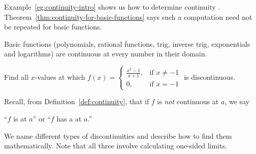 \documentclass[../main.tex]{subfiles}
\begin{document}
Example~\ref{eg:continuity-intro} shows us how to determine continuity . Theorem~\ref{thm:continuity-for-basic-functions} says such a computation need not be repeated for basic functions.

\begin{thm} \label{thm:continuity-for-basic-functions}
  Basic functions (polynomials, rational functions, trig, inverse trig, exponentials and logarithms) are continuous at every number in their domain.

\end{thm}

\begin{example}
  Find all \(x\)-values at which \(f(x) = \begin{cases} \frac{x^{2}-1}{x+1}, &\text{if } x \ne -1\\[1ex]0, &\text{if } x = -1\end{cases}\) is discontinuous.

\end{example}
\clearpage

Recall, from Definition~\ref{def:continuity}, that if \(f\) is \emph{not} continuous at \(a\), we say
\begin{center}
  ``\(f\) is  at \(a\)'' \quad or \quad ``\(f\) has a  at \(a\).''
\end{center}

We name different types of discontinuities and describe how to find them mathematically. \faStar{} Note that all three involve calculating one-sided limits.
\end{document}
